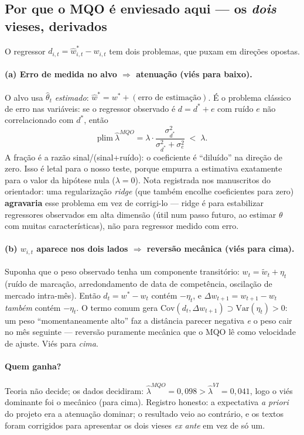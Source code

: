 \documentclass[11pt,a4paper]{article}
\begin{document}
\subsection{Por que o MQO é enviesado aqui --- os \emph{dois} vieses, derivados}

O regressor $d_{i,t}=\widehat w^*_{i,t}-w_{i,t}$ tem dois problemas, que puxam em direções
opostas.

\paragraph{(a) Erro de medida no alvo $\Rightarrow$ atenuação (viés para baixo).} O alvo usa
$\widehat\theta_t$ \emph{estimado}: $\widehat w^* = w^* + (\text{erro de estimação})$. É o
problema clássico de erro nas variáveis: se o regressor observado é $d = d^* + e$ com ruído $e$
não correlacionado com $d^*$, então
\begin{equation}
\mathrm{plim}\ \widehat\lambda^{MQO}
= \lambda\cdot\frac{\sigma^2_{d^*}}{\sigma^2_{d^*}+\sigma^2_{e}} \;<\;\lambda .
\end{equation}
A fração é a razão sinal/(sinal+ruído): o coeficiente é ``diluído'' na direção de zero. Isso é
letal para o nosso teste, porque empurra a estimativa exatamente para o valor da hipótese nula
($\lambda=0$). Nota registrada nos manuscritos do orientador: uma regularização \emph{ridge}
(que também encolhe coeficientes para zero) \textbf{agravaria} esse problema em vez de
corrigi-lo --- ridge é para estabilizar regressores observados em alta dimensão (útil num passo
futuro, ao estimar $\theta$ com muitas características), não para regressor medido com erro.

\paragraph{(b) $w_{i,t}$ aparece nos dois lados $\Rightarrow$ reversão mecânica (viés para
cima).} Suponha que o peso observado tenha um componente transitório: $w_t = \tilde w_t + \eta_t$
(ruído de marcação, arredondamento de data de competência, oscilação de mercado intra-mês). Então
$d_t = w^* - w_t$ contém $-\eta_t$, e $\Delta w_{t+1}=w_{t+1}-w_t$ \emph{também} contém $-\eta_t$.
O termo comum gera $\mathrm{Cov}(d_t,\Delta w_{t+1}) \supset \mathrm{Var}(\eta_t)>0$: um peso
``momentaneamente alto'' faz a distância parecer negativa \emph{e} o peso cair no mês seguinte
--- reversão puramente mecânica que o MQO lê como velocidade de ajuste. Viés para \emph{cima}.

\paragraph{Quem ganha?} Teoria não decide; os dados decidiram: $\widehat\lambda^{MQO}=0{,}098 >
\widehat\lambda^{VI}=0{,}041$, logo o viés dominante foi o mecânico (para cima). Registro honesto:
a expectativa \emph{a priori} do projeto era a atenuação dominar; o resultado veio ao contrário, e
os textos foram corrigidos para apresentar os dois vieses \emph{ex ante} em vez de só um.
\end{document}
